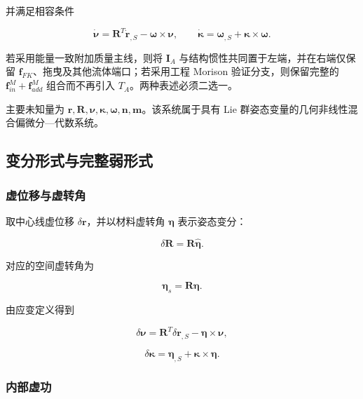 并满足相容条件

\begin{equation}
\label{eq:rod-1-75}
\dot{\bm{\nu}} = \mathbf{R}^{T}{\dot{\mathbf{r}}}_{,S} - \bm{\omega} \times \bm{\nu},\quad\quad\dot{\bm{\kappa}} = \bm{\omega}_{,S} + \bm{\kappa} \times \bm{\omega}.
\end{equation}

若采用能量一致附加质量主线，则将 \(\mathbf{I}_{A}\) 与结构惯性共同置于左端，并在右端仅保留 \(\mathbf{f}_{FK}\)、拖曳及其他流体端口；若采用工程 Morison 验证分支，则保留完整的 \(\mathbf{f}_{in}^{M} + \mathbf{f}_{add}^{M}\) 组合而不再引入 \(T_{A}\)。两种表述必须二选一。

主要未知量为 \(\mathbf{r},\mathbf{R},\bm{\nu},\bm{\kappa},\bm{\omega},\mathbf{n},\mathbf{m}\)。该系统属于具有 Lie 群姿态变量的几何非线性混合偏微分---代数系统。

\subsection{变分形式与完整弱形式}\label{sec:rod-1-5}

\subsubsection{虚位移与虚转角}\label{sec:rod-1-5-1}

取中心线虚位移 \(\delta\mathbf{r}\)，并以材料虚转角 \(\bm{\eta}\) 表示姿态变分：

\begin{equation}
\label{eq:rod-1-76}
\delta\mathbf{R} = \mathbf{R}\widehat{\bm{\eta}}.
\end{equation}

对应的空间虚转角为

\begin{equation}
\label{eq:rod-1-77}
\bm{\eta}_{s} = \mathbf{R}\bm{\eta}.
\end{equation}

由应变定义得到

\begin{equation}
\label{eq:rod-1-78}
\delta\bm{\nu} = \mathbf{R}^{T}\delta\mathbf{r}_{,S} - \bm{\eta} \times \bm{\nu},
\end{equation}

\begin{equation}
\label{eq:rod-1-79}
\delta\bm{\kappa} = \bm{\eta}_{,S} + \bm{\kappa} \times \bm{\eta}.
\end{equation}

\subsubsection{内部虚功}\label{sec:rod-1-5-2}

